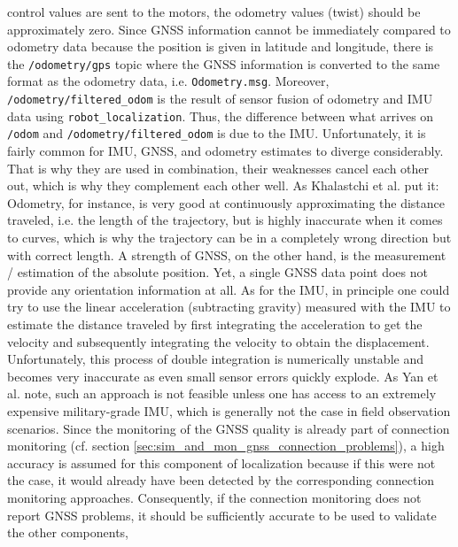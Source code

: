 \documentclass[english, master, utf8]{base/thesis_KBS}
\newcommand{\code}[1]{\colorbox{light-gray}{\texttt{#1}}}
\begin{document}
control values are sent to the motors, the odometry values (twist) should be approximately zero. Since GNSS information cannot be
immediately compared to odometry data because the position is given in latitude and longitude, there is the \code{/odometry/gps}
topic where the GNSS information is converted to the same format as the odometry data, i.e. \code{Odometry.msg}. Moreover,
\code{/odometry/filtered\_odom} is the result of sensor fusion of odometry and IMU data using \code{robot\_localization}. Thus,
the difference between what arrives on \code{/odom} and \code{/odometry/filtered\_odom} is due to the IMU. Unfortunately, it is
fairly common for IMU, GNSS, and odometry estimates to diverge considerably. That is why they are used in combination, their
weaknesses cancel each other out, which is why they complement each other well. As Khalastchi et al. put it:  \cite{Khalastchi:2018}
Odometry, for instance, is very good at continuously approximating the distance traveled,
i.e. the length of the trajectory, but is highly inaccurate when it comes to curves, which is why the trajectory can be in a completely wrong direction but with correct length.
A strength of GNSS, on the other hand, is the measurement / estimation of the absolute position. Yet, a single GNSS data point does not provide any orientation information at all.
As for the IMU, in principle one could try to use the linear acceleration (subtracting gravity) measured with the IMU to estimate the distance traveled by first integrating the
acceleration to get the velocity and subsequently integrating the velocity to obtain the displacement. Unfortunately, this process of double integration is numerically unstable
and becomes very inaccurate as even small sensor errors quickly explode. \cite{Yan:2018} As Yan et al. note, such an approach is not feasible unless one has access to an extremely
expensive military-grade IMU, which is generally not the case in field observation scenarios. Since the monitoring of the GNSS quality is already part of connection monitoring
(cf. section \ref{sec:sim_and_mon_gnss_connection_problems}), a high accuracy is assumed for this component of localization because if this were not the case, it would already have been detected by the corresponding connection
monitoring approaches. Consequently, if the connection monitoring does not report GNSS problems, it should be sufficiently accurate to be used to validate the other components,
\end{document}
